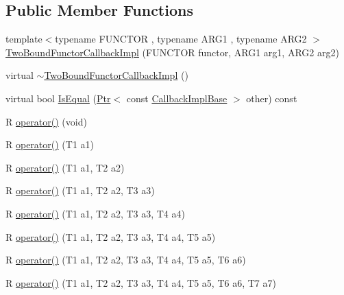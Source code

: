 \subsection*{Public Member Functions}
\begin{DoxyCompactItemize}
\item 
{\footnotesize template$<$typename F\+U\+N\+C\+T\+OR , typename A\+R\+G1 , typename A\+R\+G2 $>$ }\\\hyperlink{classns3_1_1TwoBoundFunctorCallbackImpl_a0283b0d21c636533da0147a65d8af6c5}{Two\+Bound\+Functor\+Callback\+Impl} (F\+U\+N\+C\+T\+OR functor, A\+R\+G1 arg1, A\+R\+G2 arg2)
\item 
virtual \hyperlink{classns3_1_1TwoBoundFunctorCallbackImpl_ac4a976472095119470a122a5429e951c}{$\sim$\+Two\+Bound\+Functor\+Callback\+Impl} ()
\item 
virtual bool \hyperlink{classns3_1_1TwoBoundFunctorCallbackImpl_a2b8c6d1f72fdbba3f4ba33553a1d63b1}{Is\+Equal} (\hyperlink{classns3_1_1Ptr}{Ptr}$<$ const \hyperlink{classns3_1_1CallbackImplBase}{Callback\+Impl\+Base} $>$ other) const 
\end{DoxyCompactItemize}
{\bf }\par
\begin{DoxyCompactItemize}
\item 
R \hyperlink{classns3_1_1TwoBoundFunctorCallbackImpl_afcc7aed8d1ba93bc6a322e8c4d152510}{operator()} (void)
\item 
R \hyperlink{classns3_1_1TwoBoundFunctorCallbackImpl_ab0a09ba168952b890fb98fecf5956d90}{operator()} (T1 a1)
\item 
R \hyperlink{classns3_1_1TwoBoundFunctorCallbackImpl_a5318c12f4a179d4213c6547dfaf7cf13}{operator()} (T1 a1, T2 a2)
\item 
R \hyperlink{classns3_1_1TwoBoundFunctorCallbackImpl_a614d2ec894749edf5bda9afa44a9323a}{operator()} (T1 a1, T2 a2, T3 a3)
\item 
R \hyperlink{classns3_1_1TwoBoundFunctorCallbackImpl_a763afe471df47ffdb9321d87eb5d2f92}{operator()} (T1 a1, T2 a2, T3 a3, T4 a4)
\item 
R \hyperlink{classns3_1_1TwoBoundFunctorCallbackImpl_a8964f41037c6a2cab5460088f64257b3}{operator()} (T1 a1, T2 a2, T3 a3, T4 a4, T5 a5)
\item 
R \hyperlink{classns3_1_1TwoBoundFunctorCallbackImpl_aa5de0e09602d7b1fec005dcf84345ee0}{operator()} (T1 a1, T2 a2, T3 a3, T4 a4, T5 a5, T6 a6)
\item 
R \hyperlink{classns3_1_1TwoBoundFunctorCallbackImpl_a30c14de4643d1f48fc921f675e2722ba}{operator()} (T1 a1, T2 a2, T3 a3, T4 a4, T5 a5, T6 a6, T7 a7)
\end{DoxyCompactItemize}

